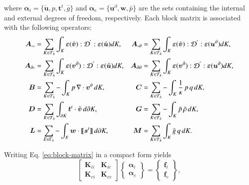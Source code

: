 \documentclass[english,11pt,3p,number,sort&compress]{elsarticle}
\newcommand{\jump}[1]
{
	\llbracket #1 \rrbracket
}
\newcommand{\smallcirc}{\text{\tiny{$\circ$}}}
\begin{document}
\noindent where $\bm{\alpha}_i=\{\mathring{\bm{u}},p,\bm{t}^t,\bar{g}\}$ and $\bm{\alpha}_e=\{\bm{u}^\partial,\bm{w},\bar{p}\}$ are the sets containing the internal and external degrees of freedom, respectively. Each block matrix is associated with the following operators:
\begin{equation}
	\begin{aligned}
		\bm{A}_{\smallcirc\smallcirc} &= \sum_{K \in \mathcal{T}_h} \int_{K} \bm{\varepsilon}(\mathring{\bm{v}}) : \mathcal{D}^{'} : \bm{\varepsilon}(\mathring{\bm{u}}) dK , &\bm{A}_{\smallcirc\partial} &= \sum_{K \in \mathcal{T}_h} \int_{K} \bm{\varepsilon}(\mathring{\bm{v}}) : \mathcal{D}^{'} : \bm{\varepsilon}(\bm{u}^\partial) dK ,\\
		\bm{A}_{\partial\smallcirc} &= \sum_{K \in \mathcal{T}_h} \int_{K} \bm{\varepsilon}(\bm{v}^\partial) : \mathcal{D}^{'} : \bm{\varepsilon}(\mathring{\bm{u}}) dK , &\bm{A}_{\partial\partial} &= \sum_{K \in \mathcal{T}_h} \int_{K} \bm{\varepsilon}(\bm{v}^\partial) : \mathcal{D}^{'} : \bm{\varepsilon}(\bm{u}^\partial) dK ,\\
		\bm{B} &= \sum_{K \in \mathcal{T}_h} -\int_{K} p \,\nabla \cdot \bm{v}^\partial \, dK , & \bm{C} &= \sum_{K \in \mathcal{T}_h} -\int_{K} \frac{1}{\kappa} \,p \,q \, dK ,\\
		\bm{D} &= \sum_{K \in \mathcal{T}_h} \int_{\partial K} \bm{t}^t \cdot \mathring{\bm{v}} \, d\partial K , &\bm{G} &= \sum_{K \in \mathcal{T}_h} -\int_{K} \bar{p} \, \bar{\rho} \, dK ,\\
		\bm{L} &= \sum_{E \in \Gamma_h} -\int_{E} \bm{w} \cdot \jump{\bm{s}^t} \, d\partial K , &\bm{M} &= \sum_{K \in \mathcal{T}_h} \int_{K} \bar{g} \, q \, dK .
	\end{aligned}
\end{equation}

Writing Eq. \eqref{eq:block-matrix} in a compact form yields
\begin{equation} \label{eq:compact-form}
	\begin{bmatrix}
		\bm{K}_{ii} & \bm{K}_{ie} \\
		\bm{K}_{ei} & \bm{K}_{ee}
	\end{bmatrix}
	\begin{Bmatrix}
		\bm{\alpha}_i \\
		\bm{\alpha}_e
	\end{Bmatrix}
	=
	\begin{Bmatrix}
		\bm{f}_i \\
		\bm{f}_e
	\end{Bmatrix},
\end{equation}
\end{document}
